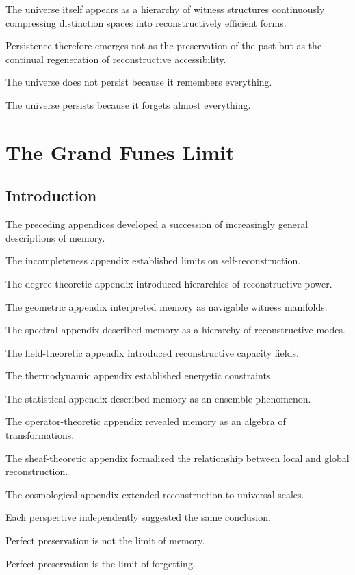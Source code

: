\documentclass[12pt,oneside]{book}
\theoremstyle{plain} \newtheorem{theorem}{Theorem}[chapter] \newtheorem{lemma}[theorem]{Lemma} \newtheorem{proposition}[theorem]{Proposition} \newtheorem{corollary}[theorem]{Corollary}
\theoremstyle{definition} \newtheorem{definition}[theorem]{Definition} \newtheorem{axiom}[theorem]{Axiom} \newtheorem{construction}[theorem]{Construction}
\theoremstyle{remark} \newtheorem{remark}[theorem]{Remark} \newtheorem{example}[theorem]{Example}
\begin{document}
The universe itself appears as a hierarchy of witness structures continuously compressing distinction spaces into reconstructively efficient forms.

Persistence therefore emerges not as the preservation of the past but as the continual regeneration of reconstructive accessibility.

The universe does not persist because it remembers everything.

The universe persists because it forgets almost everything.

\chapter{The Grand Funes Limit}

\section{Introduction}

The preceding appendices developed a succession of increasingly general descriptions of memory.

The incompleteness appendix established limits on self-reconstruction.

The degree-theoretic appendix introduced hierarchies of reconstructive power.

The geometric appendix interpreted memory as navigable witness manifolds.

The spectral appendix described memory as a hierarchy of reconstructive modes.

The field-theoretic appendix introduced reconstructive capacity fields.

The thermodynamic appendix established energetic constraints.

The statistical appendix described memory as an ensemble phenomenon.

The operator-theoretic appendix revealed memory as an algebra of transformations.

The sheaf-theoretic appendix formalized the relationship between local and global reconstruction.

The cosmological appendix extended reconstruction to universal scales.

Each perspective independently suggested the same conclusion.

Perfect preservation is not the limit of memory.

Perfect preservation is the limit of forgetting.
\end{document}
